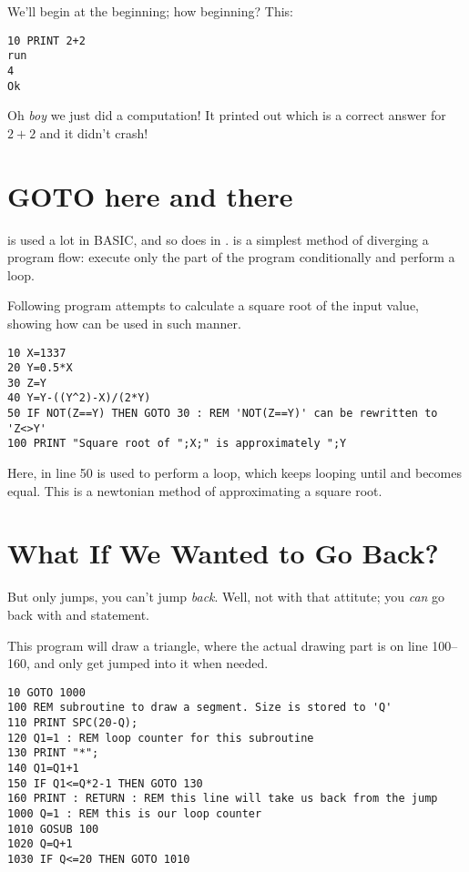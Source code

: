 \quad
{}

We'll begin at the beginning; how beginning? This:

\begin{lstlisting}
10 PRINT 2+2
run
4
Ok
\end{lstlisting}

Oh \emph{boy} we just did a computation! It printed out  which is a correct answer for $2+2$ and it didn't crash!

\section[GOTO]{GOTO here and there}

 is used a lot in BASIC, and so does in \tbas.  is a simplest method of diverging a program flow: execute only the part of the program conditionally and perform a loop.

Following program attempts to calculate a square root of the input value,  showing how  can be used in such manner.

\begin{lstlisting}
10 X=1337
20 Y=0.5*X
30 Z=Y
40 Y=Y-((Y^2)-X)/(2*Y)
50 IF NOT(Z==Y) THEN GOTO 30 : REM 'NOT(Z==Y)' can be rewritten to 'Z<>Y' 
100 PRINT "Square root of ";X;" is approximately ";Y
\end{lstlisting}

Here,  in line 50 is used to perform a loop, which keeps looping until  and  becomes equal. This is a newtonian method of approximating a square root. 

\section[Subroutine with GOSUB]{What If We Wanted to Go Back?}

But  only jumps, you can't jump \emph{back}. Well, not with that attitute; you \emph{can} go back with  and  statement.

This program will draw a triangle, where the actual drawing part is on line 100--160, and only get jumped into it when needed.

\begin{lstlisting}
10 GOTO 1000
100 REM subroutine to draw a segment. Size is stored to 'Q'
110 PRINT SPC(20-Q);
120 Q1=1 : REM loop counter for this subroutine
130 PRINT "*";
140 Q1=Q1+1
150 IF Q1<=Q*2-1 THEN GOTO 130
160 PRINT : RETURN : REM this line will take us back from the jump
1000 Q=1 : REM this is our loop counter
1010 GOSUB 100
1020 Q=Q+1
1030 IF Q<=20 THEN GOTO 1010
\end{lstlisting}

